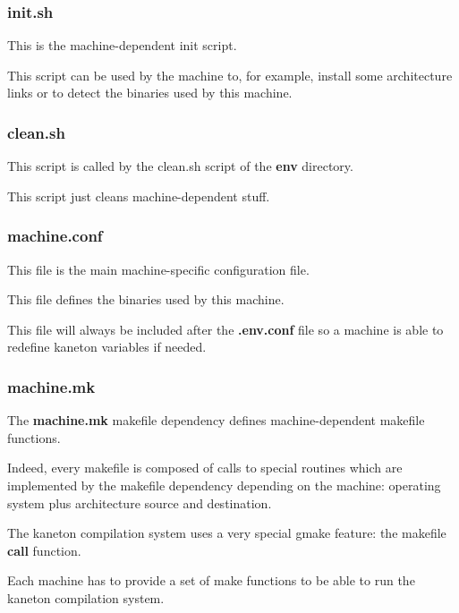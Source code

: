\begin{frame}
  \frametitle{init.sh}

  This is the machine-dependent init script.

  \nl

  This script can be used by the machine to, for example, install some
  architecture links or to detect the binaries used by this machine.
\end{frame}


\begin{frame}
  \frametitle{clean.sh}

  This script is called by the clean.sh script of the \textbf{env}
  directory.

  \nl

  This script just cleans machine-dependent stuff.
\end{frame}


\begin{frame}
  \frametitle{machine.conf}

  This file is the main machine-specific configuration file.

  \nl

  This file defines the binaries used by this machine.

  \nl

  This file will always be included after the \textbf{.env.conf}
  file so a machine is able to redefine kaneton variables if needed.
\end{frame}


\begin{frame}
  \frametitle{machine.mk}

  The \textbf{machine.mk} makefile dependency defines machine-dependent
  makefile functions.

  \nl

  Indeed, every makefile is composed of calls to special routines
  which are implemented by the makefile dependency depending on the
  machine: operating system plus architecture source and destination.

  \nl

  The kaneton compilation system uses a very special gmake feature:
  the makefile \textbf{call} function.

  \nl

  Each machine has to provide a set of make functions to be able to run
  the kaneton compilation system.
\end{frame}

